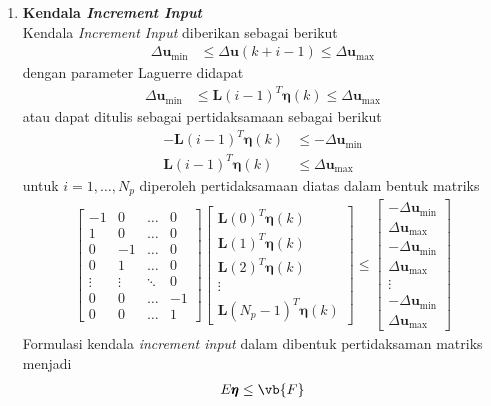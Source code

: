 \begin{enumerate}
    \item \textbf{Kendala \textit{Increment Input}} \\
    Kendala \textit{Increment Input} diberikan sebagai berikut
    \begin{align*}
     \Delta\pmb{u}_{\min} &\leq \Delta\pmb{u}(k+i-1) \leq \Delta \pmb{u}_{\max} 
    \end{align*}
    dengan parameter Laguerre didapat
    \begin{align*}
        \Delta\pmb{u}_{\min} &\leq \pmb{L}(i-1)^T\pmb{\eta}(k) \leq \Delta \pmb{u}_{\max}
    \end{align*}
    atau dapat ditulis sebagai pertidaksamaan sebagai berikut
    \begin{align*}
        -\pmb{L}(i-1)^T\pmb{\eta}(k) &\leq -\Delta\pmb{u}_{\min} \\
        \pmb{L}(i-1)^T\pmb{\eta}(k) &\leq \Delta \pmb{u}_{\max}
    \end{align*}
    untuk $i=1,\hdots,N_p$ diperoleh pertidaksamaan diatas dalam bentuk matriks 
    \begin{align*}
        \begin{bmatrix}
            -1 & 0 & \hdots & 0 \\ 
            1 & 0 & \hdots & 0 \\
            0 & -1 & \hdots & 0 \\
            0 & 1 & \hdots & 0 \\
            \vdots & \vdots & \ddots & 0\\
            0 & 0 & \hdots & -1 \\
            0 & 0 & \hdots & 1 
        \end{bmatrix} \begin{bmatrix}
            \pmb{L}(0)^T\pmb{\eta}(k) \\
            \pmb{L}(1)^T\pmb{\eta}(k) \\
            \pmb{L}(2)^T\pmb{\eta}(k) \\
            \vdots \\
            \pmb{L}(N_p-1)^T\pmb{\eta}(k)
        \end{bmatrix} \leq \begin{bmatrix}
            -\Delta\pmb{u}_{\min} \\ \Delta\pmb{u}_{\max} \\ -\Delta\pmb{u}_{\min} \\ \Delta\pmb{u}_{\max} \\ \vdots \\ -\Delta\pmb{u}_{\min} \\ \Delta\pmb{u}_{\max}
        \end{bmatrix}
    \end{align*}
    Formulasi kendala \textit{increment input} dalam dibentuk pertidaksaman matriks menjadi
    \begin{align*}
        E \pmb{\eta} \leq \vb{F}
    \end{align*}
    

\end{enumerate}
